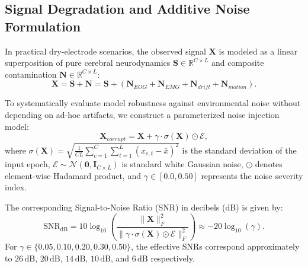 \documentclass[conference]{IEEEtran}
\begin{document}
\subsection{Signal Degradation and Additive Noise Formulation}
In practical dry-electrode scenarios, the observed signal $\mathbf{X}$ is modeled as a linear superposition of pure cerebral neurodynamics $\mathbf{S} \in \mathbb{R}^{C \times L}$ and composite contamination $\mathbf{N} \in \mathbb{R}^{C \times L}$:
\begin{equation}
    \mathbf{X} = \mathbf{S} + \mathbf{N} = \mathbf{S} + \left( \mathbf{N}_{EOG} + \mathbf{N}_{EMG} + \mathbf{N}_{drift} + \mathbf{N}_{motion} \right).
\end{equation}

To systematically evaluate model robustness against environmental noise without depending on ad-hoc artifacts, we construct a parameterized noise injection model:
\begin{equation}
    \mathbf{X}_{corrupt} = \mathbf{X} + \gamma \cdot \sigma(\mathbf{X}) \odot \boldsymbol{\mathcal{E}},
    \label{eq:noise_model}
\end{equation}
where $\sigma(\mathbf{X}) = \sqrt{\frac{1}{CL}\sum_{c=1}^C \sum_{t=1}^L (x_{c,t} - \bar{x})^2}$ is the standard deviation of the input epoch, $\boldsymbol{\mathcal{E}} \sim \mathcal{N}(\mathbf{0}, \mathbf{I}_{C \times L})$ is standard white Gaussian noise, $\odot$ denotes element-wise Hadamard product, and $\gamma \in [0.0, 0.50]$ represents the noise severity index.

The corresponding Signal-to-Noise Ratio (SNR) in decibels ($\text{dB}$) is given by:
\begin{equation}
    \text{SNR}_{\text{dB}} = 10 \log_{10}\left( \frac{\|\mathbf{X}\|_F^2}{\|\gamma \cdot \sigma(\mathbf{X}) \odot \boldsymbol{\mathcal{E}}\|_F^2} \right) \approx -20 \log_{10}(\gamma).
\end{equation}
For $\gamma \in \{0.05, 0.10, 0.20, 0.30, 0.50\}$, the effective SNRs correspond approximately to $26\,\text{dB}$, $20\,\text{dB}$, $14\,\text{dB}$, $10\,\text{dB}$, and $6\,\text{dB}$ respectively.
\end{document}
